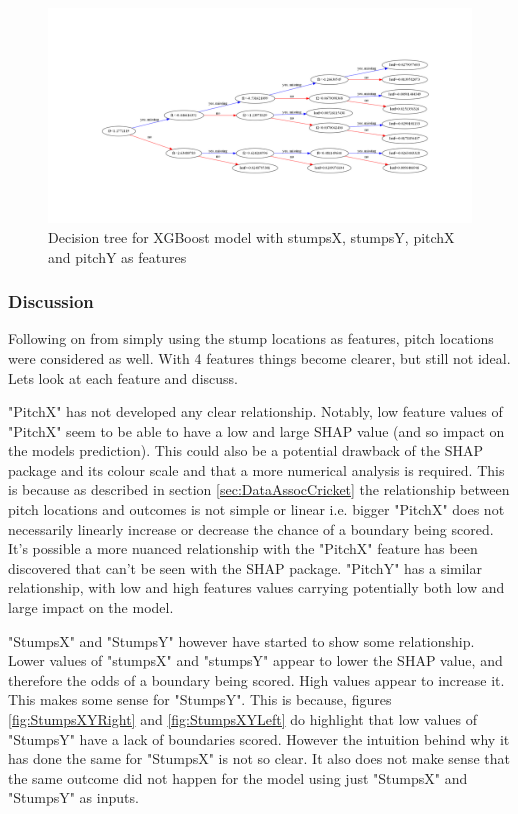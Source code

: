 \documentclass[12pt,a4paper]{report}
\theoremstyle{definition}
\begin{document}
\begin{figure}[H]
    \centering
    \includegraphics[width=\linewidth]{tree_stumps_pitch.png}
    \caption{Decision tree for XGBoost model with stumpsX, stumpsY, pitchX and pitchY as features}
    \label{fig:TreeStumpsPitch}
\end{figure}

\subsubsection{Discussion}

Following on from simply using the stump locations as features, pitch locations were considered as well.
With 4 features things become clearer, but still not ideal.
Lets look at each feature and discuss.

"PitchX" has not developed any clear relationship. 
Notably, low feature values of "PitchX" seem to be able to have a low and large SHAP value (and so impact on the models prediction).
This could also be a potential drawback of the SHAP package and its colour scale and that a more numerical analysis is required.
This is because as described in section \ref{sec:DataAssocCricket} the relationship between pitch locations and outcomes is not simple or linear i.e. bigger "PitchX" does not necessarily linearly increase or decrease the chance of a boundary being scored.
It's possible a more nuanced relationship with the "PitchX" feature has been discovered that can't be seen with the SHAP package.
"PitchY" has a similar relationship, with low and high features values carrying potentially both low and large impact on the model.

"StumpsX" and "StumpsY" however have started to show some relationship.
Lower values of "stumpsX" and "stumpsY" appear to lower the SHAP value, and therefore the odds of a boundary being scored.
High values appear to increase it. 
This makes some sense for "StumpsY".
This is because, figures \ref{fig:StumpsXYRight} and \ref{fig:StumpsXYLeft} do highlight that low values of "StumpsY" have a lack of boundaries scored.
However the intuition behind why it has done the same for "StumpsX" is not so clear. 
It also does not make sense that the same outcome did not happen for the model using just "StumpsX" and "StumpsY" as inputs.
\end{document}
